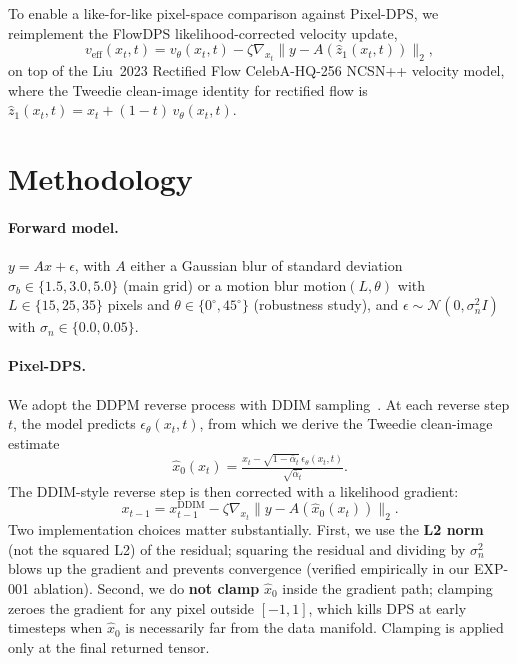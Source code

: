 \documentclass{article}
\begin{document}
To enable a like-for-like pixel-space comparison against Pixel-DPS, we
reimplement the FlowDPS likelihood-corrected velocity update,
\begin{equation}
  v_\text{eff}(x_t, t) = v_\theta(x_t, t) - \zeta \nabla_{x_t}
    \| y - A( \hat z_1(x_t, t) ) \|_2,
\end{equation}
on top of the Liu~2023 Rectified Flow CelebA-HQ-256 NCSN++ velocity
model, where the Tweedie clean-image identity for rectified flow is
$\hat z_1(x_t, t) = x_t + (1 - t)\,v_\theta(x_t, t)$.

\section{Methodology}\label{sec:method}

\paragraph{Forward model.}
$y = A x + \epsilon$, with $A$ either a Gaussian blur of standard
deviation $\sigma_b \in \{1.5, 3.0, 5.0\}$ (main grid) or a motion blur
$\text{motion}(L,\theta)$ with $L \in \{15, 25, 35\}$ pixels and
$\theta \in \{0^\circ, 45^\circ\}$ (robustness study), and
$\epsilon \sim \mathcal{N}(0, \sigma_n^2 I)$ with
$\sigma_n \in \{0.0, 0.05\}$.

\paragraph{Pixel-DPS.}
We adopt the DDPM reverse process with DDIM sampling~\cite{song2021ddim}. At each reverse
step $t$, the model predicts $\epsilon_\theta(x_t, t)$, from which we
derive the Tweedie clean-image estimate
\begin{equation}
  \hat x_0(x_t) = \tfrac{x_t - \sqrt{1 - \bar\alpha_t}\,\epsilon_\theta(x_t, t)}{\sqrt{\bar\alpha_t}}.
\end{equation}
The DDIM-style reverse step is then corrected with a likelihood gradient:
\begin{equation}
  x_{t-1} = x_{t-1}^{\text{DDIM}} - \zeta \nabla_{x_t} \| y - A(\hat x_0(x_t)) \|_2.
\end{equation}
Two implementation choices matter substantially. First, we use the
\textbf{L2 norm} (not the squared L2) of the residual; squaring the
residual and dividing by $\sigma_n^2$ blows up the gradient and prevents
convergence (verified empirically in our EXP-001 ablation). Second, we do
\textbf{not clamp} $\hat x_0$ inside the gradient path; clamping zeroes
the gradient for any pixel outside $[-1, 1]$, which kills DPS at early
timesteps when $\hat x_0$ is necessarily far from the data manifold.
Clamping is applied only at the final returned tensor.
\end{document}
